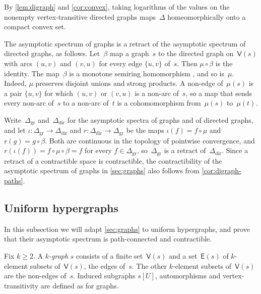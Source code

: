 \documentclass[11pt,letterpaper]{article}
\begin{document}
By \cref{lem:digraph} and \cref{cor:convex}, taking logarithms of the values on the nonempty vertex-transitive directed graphs maps~$\Delta$ homeomorphically onto a compact convex set.

The asymptotic spectrum of graphs is a retract of the asymptotic spectrum of directed graphs, as follows. Let~$\beta$ map a graph~$s$ to the directed graph on~$\mathsf{V}(s)$ with arcs $(u,v)$ and $(v,u)$ for every edge $\{u,v\}$ of~$s$. Then $\mu \circ \beta$ is the identity. The map~$\beta$ is a monotone semiring homomorphism \cite[Example~4.17]{wigderson2022asymptotic}, and so is~$\mu$. Indeed, $\mu$ preserves disjoint unions and strong products. A non-edge of~$\mu(s)$ is a pair $\{u,v\}$ for which $(u,v)$ or $(v,u)$ is a non-arc of~$s$, so a map that sends every non-arc of~$s$ to a non-arc of~$t$ is a cohomomorphism from~$\mu(s)$ to~$\mu(t)$. 

Write~$\Delta_{\mathrm{gr}}$ and~$\Delta_{\mathrm{dir}}$ for the asymptotic spectra of graphs and of directed graphs, and let $\iota : \Delta_{\mathrm{gr}} \to \Delta_{\mathrm{dir}}$ and $r : \Delta_{\mathrm{dir}} \to \Delta_{\mathrm{gr}}$ be the maps $\iota(f) = f \circ \mu$ and $r(g) = g \circ \beta$. Both are continuous in the topology of pointwise convergence, and $r(\iota(f)) = f \circ \mu \circ \beta = f$ for every $f \in \Delta_{\mathrm{gr}}$, so~$\Delta_{\mathrm{gr}}$ is a retract of~$\Delta_{\mathrm{dir}}$. Since a retract of a contractible space is contractible, the contractibility of the asymptotic spectrum of graphs in \cref{sec:graphs} also follows from \cref{cor:digraph-paths}.

\subsection{Uniform hypergraphs}\label{sec:hypergraphs}

In this subsection we will adapt \cref{sec:graphs} to uniform hypergraphs, and prove that their asymptotic spectrum is path-connected and contractible. 

Fix $k \geq 2$. A \emph{$k$-graph} $s$ consists of a finite set~$\mathsf{V}(s)$ and a set~$\mathsf{E}(s)$ of $k$-element subsets of~$\mathsf{V}(s)$, the edges of~$s$. The other $k$-element subsets of~$\mathsf{V}(s)$ are the non-edges of~$s$. Induced subgraphs $s[U]$, automorphisms and vertex-transitivity are defined as for graphs.
\end{document}
